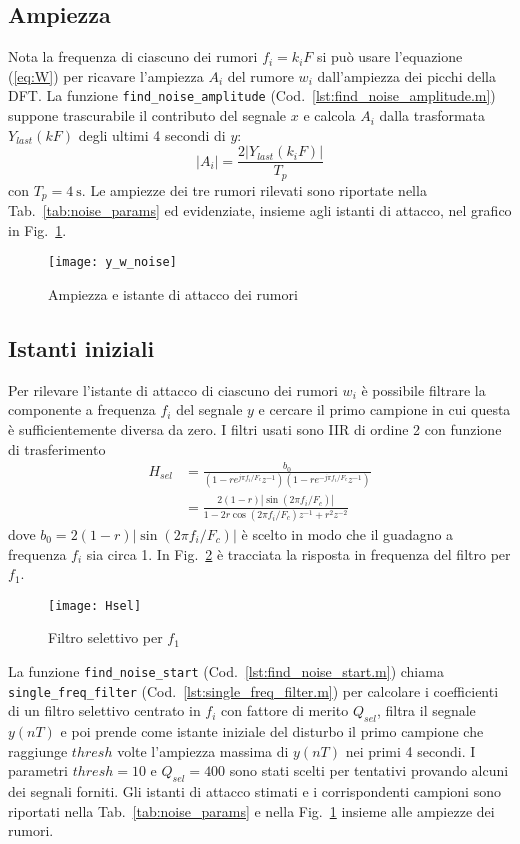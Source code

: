 \documentclass{article}
\newcommand{\fig}[1]{Fig.~\ref{#1}}
\newcommand{\cod}[1]{Cod.~\ref{#1}}
\newcommand{\tab}[1]{Tab.~\ref{#1}}
\newcommand{\eqn}[1]{(\ref{#1})}
\newcommand{\inlcd}[1]{\lstinline[basicstyle=\ttfamily,keywordstyle={}]{#1}}
\begin{document}
\subsection{Ampiezza}
Nota la frequenza di ciascuno dei rumori $f_i = k_iF$ si può usare
l'equazione \eqn{eq:W} per ricavare l'ampiezza $A_i$ del rumore $w_i$
dall'ampiezza dei picchi della DFT.  La funzione
\inlcd{find_noise_amplitude} (\cod{lst:find_noise_amplitude.m})
suppone trascurabile il contributo del segnale $x$ e calcola $A_i$
dalla trasformata $Y_\mathit{last}(kF)$ degli ultimi 4 secondi di $y$:
\begin{equation}
  |A_i| = \frac{2|Y_\mathit{last}(k_iF)|}{T_p}
\end{equation}
con $T_p = \SI{4}{\s}$. Le ampiezze dei tre rumori rilevati sono
riportate nella \tab{tab:noise_params} ed evidenziate, insieme agli
istanti di attacco, nel grafico in \fig{plot:y_w_noises}.

\begin{figure}[h]
  \centering
  \texttt{[image: y\_w\_noise]}
  \caption{Ampiezza e istante di attacco dei rumori}
  \label{plot:y_w_noises}
\end{figure}

\subsection{Istanti iniziali}
Per rilevare l'istante di attacco di ciascuno dei rumori $w_i$ è
possibile filtrare la componente a frequenza $f_i$ del segnale $y$ e
cercare il primo campione in cui questa è sufficientemente diversa da
zero. I filtri usati sono IIR di ordine 2 con funzione di
trasferimento
\begin{align}
  H_\mathit{sel} &= \frac{b_0}{
    (1 - re^{j\pi f_i/F_c}z^{-1})
    (1 - re^{-j\pi f_i/F_c}z^{-1})} \\
  &= \frac{2(1-r)|\sin(2\pi f_i/F_c)|}
  {1 - 2r\cos(2\pi f_i/F_c)z^{-1} + r^2z^{-2}}
\end{align}
dove $b_0 = 2(1-r)|\sin(2\pi f_i/F_c)|$ è scelto in modo che il
guadagno a frequenza $f_i$ sia circa 1. In \fig{plot:Hsel} è tracciata
la risposta in frequenza del filtro per $f_1$.

\begin{figure}[h]
  \centering
  \texttt{[image: Hsel]}
  \caption{Filtro selettivo per $f_1$}
  \label{plot:Hsel}
\end{figure}

La funzione \inlcd{find_noise_start} (\cod{lst:find_noise_start.m})
chiama \inlcd{single_freq_filter} (\cod{lst:single_freq_filter.m}) per
calcolare i coefficienti di un filtro selettivo centrato in $f_i$ con
fattore di merito $Q_\mathit{sel}$, filtra il segnale $y(nT)$ e poi
prende come istante iniziale del disturbo il primo campione che
raggiunge $\mathit{thresh}$ volte l'ampiezza massima di $y(nT)$ nei
primi 4 secondi. I parametri $\mathit{thresh} = 10$ e $Q_\mathit{sel}
= 400$ sono stati scelti per tentativi provando alcuni dei segnali
forniti.  Gli istanti di attacco stimati e i corrispondenti campioni
sono riportati nella \tab{tab:noise_params} e nella
\fig{plot:y_w_noises} insieme alle ampiezze dei rumori.
\end{document}
